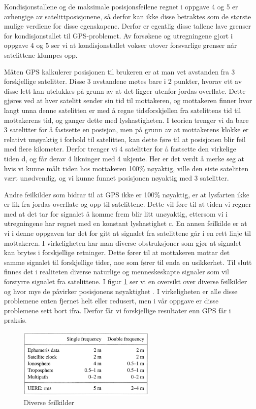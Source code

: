 \vspace{5mm}

Kondisjonstallene og de maksimale posisjonsfeilene regnet i oppgave 4 og 5 er avhengige av satelittposisjonene, så derfor kan ikke disse betraktes som de største mulige verdiene for disse egenskapene. Derfor er egentlig disse tallene lave grenser for kondisjonstallet til GPS-problemet. Av forsøkene og utregningene gjort i oppgave 4 og 5 ser vi at kondisjonstallet vokser utover forsvarlige grenser når satelittene klumpes opp. 

\vspace{5mm}

Måten GPS kalkulerer posisjonen til brukeren er at man vet avstanden fra 3 forskjellige satelitter. Disse 3 avstandene møtes bare i 2 punkter, hvorav ett av disse lett kan utelukkes på grunn av at det ligger utenfor jordas overflate. Dette gjøres ved at hver satelitt sender sin tid til mottakeren, og mottakeren finner hvor langt unna denne satelitten er med å regne tidsforskjellen fra satelittens tid til mottakerens tid, og ganger dette med lyshastigheten. I teorien trenger vi da bare 3 satelitter for å fastsette en posisjon, men på grunn av at mottakerens klokke er relativt unøyaktig i forhold til satelitten, kan dette føre til at posisjonen blir feil med flere kilometer. Derfor trenger vi 4 satelitter for å fastsette den virkelige tiden d, og får derav 4 likninger med 4 ukjente. Her er det verdt å merke seg at hvis vi kunne målt tiden hos mottakeren 100\% nøyaktig, ville den siste satelitten vært unødvendig, og vi kunne funnet posisjonen nøyaktig med 3 satelitter. 

\vspace{5mm}

Andre feilkilder som bidrar til at GPS ikke er 100\% nøyaktig, er at lysfarten ikke er lik fra jordas overflate og opp til satelittene. Dette vil føre til at tiden vi regner med at det tar for signalet å komme frem blir litt unøyaktig, ettersom vi i utregningene har regnet med en konstant lyshastighet c. En annen feilkilde er at vi i denne oppgaven tar det for gitt at signalet fra satelittene går i en rett linje til mottakeren. I virkeligheten har man diverse obstruksjoner som gjør at signalet kan brytes i forskjellige retninger. Dette fører til at mottakeren mottar det samme signalet til forskjellige tider, noe som fører til enda en usikkerhet. Til slutt finnes det i realiteten diverse naturlige og menneskeskapte signaler som vil forstyrre signalet fra satelittene. I figur \ref{fig:errortable} ser vi en oversikt over diverse feilkilder og hvor mye de påvirker posisjonens nøyaktighet \cite{StrangBorre}. I virkeligheten er alle disse problemene enten fjernet helt eller redusert, men i vår oppgave er disse problemene sett bort ifra. Derfor får vi forskjellige resultater enn GPS får i praksis. 

\begin{figure}[h]
	\centering
	\includegraphics[width=0.60\textwidth]{sections/Conclusion/errortable.jpg}
	\caption{Diverse feilkilder}
	\label{fig:errortable}
\end{figure}